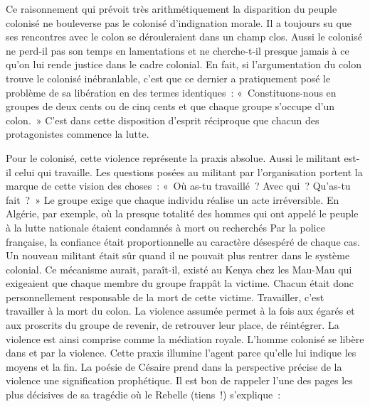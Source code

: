 \documentclass[french,twoside]{book} %
\begin{document}
Ce raisonnement qui prévoit très arithmétiquement la disparition du peuple colonisé ne bouleverse pas le colonisé d’indignation morale. Il a toujours su que ses rencontres avec le colon se dérouleraient dans un champ clos. Aussi le colonisé ne perd-il pas son temps en lamentations et ne cherche-t-il presque jamais à ce qu’on lui rende justice dans le cadre colonial. En fait, si l’argumentation du colon trouve le colonisé inébranlable, c’est que ce dernier a pratiquement posé le problème de sa libération en des termes identiques : « Constituons-nous en groupes de deux cents ou de cinq cents et que chaque groupe s’occupe d’un colon. » C’est dans cette disposition d’esprit réciproque que chacun des protagonistes commence la lutte.\par
\bigbreak
\noindent Pour le colonisé, cette violence représente la praxis absolue. Aussi le militant est-il celui qui travaille. Les questions posées au militant par l’organisation portent la marque de cette vision des choses : « Où as-tu travaillé ? Avec qui ? Qu’as-tu fait ? » Le groupe exige que chaque individu réalise un acte irréversible. En Algérie, par exemple, où la presque totalité des hommes qui ont appelé le peuple à la lutte nationale étaient condamnés à mort ou recherchés Par la police française, la confiance était proportionnelle au caractère désespéré de chaque cas. Un nouveau militant était sûr quand il ne pouvait plus rentrer dans le système colonial. Ce mécanisme aurait, paraît-il, existé au Kenya chez les Mau-Mau qui exigeaient que chaque membre du   groupe frappât la victime. Chacun était donc personnellement responsable de la mort de cette victime. Travailler, c’est travailler à la mort du colon. La violence assumée permet à la fois aux égarés et aux proscrits du groupe de revenir, de retrouver leur place, de réintégrer. La violence est ainsi comprise comme la médiation royale. L’homme colonisé se libère dans et par la violence. Cette praxis illumine l’agent parce qu’elle lui indique les moyens et la fin. La poésie de Césaire prend dans la perspective précise de la violence une signification prophétique. Il est bon de rappeler l’une des pages les plus décisives de sa tragédie où le Rebelle (tiens !) s’explique :\par
\end{document}
